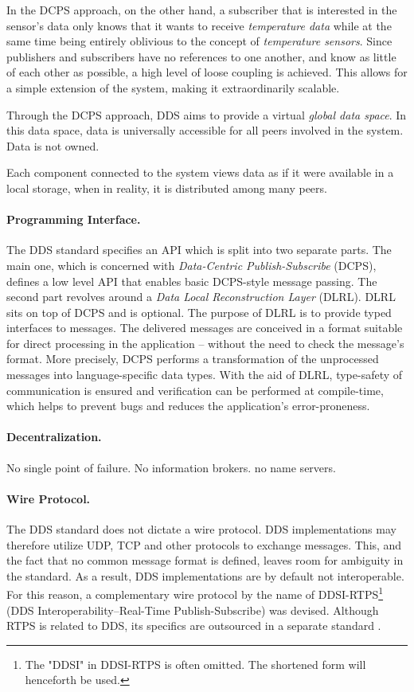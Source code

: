 In the DCPS approach, on the other hand, a subscriber that is interested in the sensor's data only knows that it wants to receive \emph{temperature data} while at the same time being entirely oblivious to the concept of \emph{temperature sensors}. 
Since publishers and subscribers have no references to one another, and know as little of each other as possible, a high level of loose coupling is achieved. This allows for a simple extension of the system, making it extraordinarily scalable.

Through the DCPS approach, DDS aims to provide a virtual \emph{global data space}. In this data space, data is universally accessible for all peers involved in the system. Data is not owned. 

Each component connected to the system views data as if it were available in a local storage, when in reality, it is distributed among many peers.


\paragraph{Programming Interface.}
The DDS standard specifies an API which is split into two separate parts. The main one, which is concerned with \emph{Data-Centric Publish-Subscribe} (DCPS), defines a low level API that enables basic DCPS-style message passing. The second part revolves around a \emph{Data Local Reconstruction Layer} (DLRL). DLRL sits on top of DCPS and is optional. The purpose of DLRL is to provide typed interfaces to messages. The delivered messages are conceived in a format suitable for direct processing in the application -- without the need to check the message's format. More precisely, DCPS performs a transformation of the unprocessed messages into language-specific data types. With the aid of DLRL, type-safety of communication is ensured and verification can be performed at compile-time, which helps to prevent bugs and reduces the application's error-proneness.


\paragraph{Decentralization.}
No single point of failure. No information brokers. no name servers.

\paragraph{Wire Protocol.}
The DDS standard does not dictate a wire protocol. DDS implementations may therefore utilize UDP, TCP and other protocols to exchange messages. This, and the fact that no common message format is defined, leaves room for ambiguity in the standard. As a result, DDS implementations are by default not interoperable. For this reason, a complementary wire protocol by the name of DDSI-RTPS\footnote{The "DDSI" in DDSI-RTPS is often omitted. The shortened form will henceforth be used.} (DDS Interoperability--Real-Time Publish-Subscribe) was devised. Although RTPS is related to DDS, its specifics are outsourced in a separate standard \cite{rtps-2.2-standard}.



